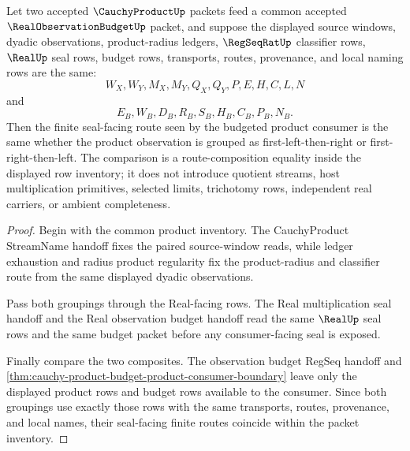 \begin{theorem}
\label{thm:cauchy-product-budget-product-associative-route}
Let two accepted $\CauchyProductUp$ packets feed a common accepted $\RealObservationBudgetUp$ packet, and suppose the displayed source windows, dyadic observations, product-radius ledgers, $\RegSeqRatUp$ classifier rows, $\RealUp$ seal rows, budget rows, transports, routes, provenance, and local naming rows are the same:
$$
W_X,W_Y,M_X,M_Y,Q_X,Q_Y,P,E,H,C,L,N
$$
and
$$
E_B,W_B,D_B,R_B,S_B,H_B,C_B,P_B,N_B.
$$
Then the finite seal-facing route seen by the budgeted product consumer is the same whether the product observation is grouped as first-left-then-right or first-right-then-left. The comparison is a route-composition equality inside the displayed row inventory; it does not introduce quotient streams, host multiplication primitives, selected limits, trichotomy rows, independent real carriers, or ambient completeness.
\end{theorem}
\begin{proof}
Begin with the common product inventory. The CauchyProduct StreamName handoff fixes the paired source-window reads, while ledger exhaustion and radius product regularity fix the product-radius and classifier route from the same displayed dyadic observations.

Pass both groupings through the Real-facing rows. The Real multiplication seal handoff and the Real observation budget handoff read the same $\RealUp$ seal rows and the same budget packet before any consumer-facing seal is exposed.

Finally compare the two composites. The observation budget RegSeq handoff and \autoref{thm:cauchy-product-budget-product-consumer-boundary} leave only the displayed product rows and budget rows available to the consumer. Since both groupings use exactly those rows with the same transports, routes, provenance, and local names, their seal-facing finite routes coincide within the packet inventory.
\end{proof}

